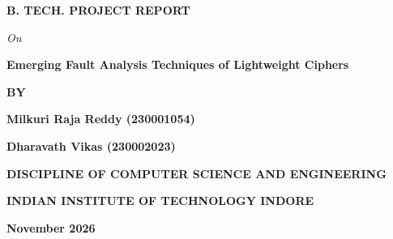 \documentclass[12pt,a4paper,oneside]{report}
\begin{document}

\begin{titlepage}
\centering
\vspace*{0.5cm}
{\huge \textbf{B. TECH. PROJECT REPORT}\par}
\vspace{1.0cm}
{\Large \textit{On}\par}
\vspace{1.0cm}
{\huge \textbf{\textcolor{NavyBlue}{Emerging Fault Analysis Techniques of Lightweight Ciphers}}\par}
\vspace{2.5cm}
{\Large \textbf{BY}\par}
\vspace{0.8cm}
{\LARGE \textbf{Milkuri Raja Reddy (230001054)}\par}
\vspace{0.3cm}
{\LARGE \textbf{Dharavath Vikas (230002023)}\par}
\vfill
{\Large \textbf{DISCIPLINE OF COMPUTER SCIENCE AND ENGINEERING}\par}
\vspace{0.4cm}
{\Large \textbf{INDIAN INSTITUTE OF TECHNOLOGY INDORE}\par}
\vspace{0.4cm}
{\Large \textbf{November 2026}\par}
\vspace*{0.5cm}
\end{titlepage}

\cleardoublepage
\end{document}
